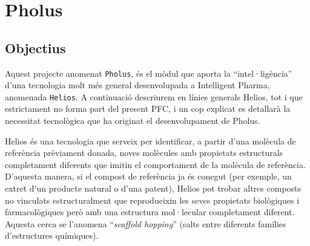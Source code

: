 %

\chapter{Pholus} %
\label{cha:Pholus}

\section{Objectius} %
\label{sec:Objectius}
Aquest projecte anomenat \texttt{Pholus}, és el mòdul que aporta la ``intel·ligència'' d'una tecnologia
molt més general desenvolupada a Intelligent Pharma, anomenada \texttt{Helios}. A continuació descriurem
en línies generals Helios, tot i que estrictament no forma part del present PFC, i un cop explicat es detallarà
la necessitat tecnològica que ha originat el desenvolupament de Pholus.



Helios és una tecnologia que serveix per identificar, a partir d'una molècula de referència prèviament donada,
noves molècules amb propietats estructurals completament diferents que imitin el comportament de la molècula de
referència. D'aquesta manera, si el compost de referència ja és conegut (per exemple, un extret d'un
producte natural o d'una patent), Helios pot trobar altres composts no vinculats estructuralment que
reprodueixin les seves propietats biològiques i farmacològiques però amb una estructura mol·lecular completament diferent.
Aquesta cerca se l'anomena ``\emph{scaffold hopping}'' (salts entre diferents famílies d'estructures químiques).


